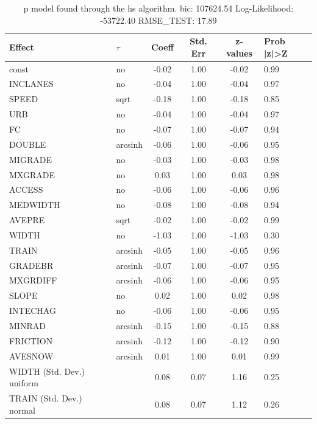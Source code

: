 \begin{table}
	\caption{p model found through the hs algorithm. bic: 107624.54 Log-Likelihood: -53722.40 RMSE_TEST: 17.89}
	\begin{center}
		\begin{tabular}{|l|l|c|c|c|l|}
			\hline
			Effect & $\tau$ & Coeff & Std. Err & z-values & Prob |z|>Z \\
			\hline
			const & no & -0.02 & 1.00 & -0.02 & 0.99 \\
			\hline
			INCLANES & no & -0.04 & 1.00 & -0.04 & 0.97 \\
			\hline
			SPEED & sqrt & -0.18 & 1.00 & -0.18 & 0.85 \\
			\hline
			URB & no & -0.04 & 1.00 & -0.04 & 0.97 \\
			\hline
			FC & no & -0.07 & 1.00 & -0.07 & 0.94 \\
			\hline
			DOUBLE & arcsinh & -0.06 & 1.00 & -0.06 & 0.95 \\
			\hline
			MIGRADE & no & -0.03 & 1.00 & -0.03 & 0.98 \\
			\hline
			MXGRADE & no & 0.03 & 1.00 & 0.03 & 0.98 \\
			\hline
			ACCESS & no & -0.06 & 1.00 & -0.06 & 0.96 \\
			\hline
			MEDWIDTH & no & -0.08 & 1.00 & -0.08 & 0.94 \\
			\hline
			AVEPRE & sqrt & -0.02 & 1.00 & -0.02 & 0.99 \\
			\hline
			WIDTH & no & -1.03 & 1.00 & -1.03 & 0.30 \\
			\hline
			TRAIN & arcsinh & -0.05 & 1.00 & -0.05 & 0.96 \\
			\hline
			GRADEBR & arcsinh & -0.07 & 1.00 & -0.07 & 0.95 \\
			\hline
			MXGRDIFF & arcsinh & -0.06 & 1.00 & -0.06 & 0.95 \\
			\hline
			SLOPE & no & 0.02 & 1.00 & 0.02 & 0.98 \\
			\hline
			INTECHAG & no & -0.06 & 1.00 & -0.06 & 0.95 \\
			\hline
			MINRAD & arcsinh & -0.15 & 1.00 & -0.15 & 0.88 \\
			\hline
			FRICTION & arcsinh & -0.12 & 1.00 & -0.12 & 0.90 \\
			\hline
			AVESNOW & arcsinh & 0.01 & 1.00 & 0.01 & 0.99 \\
			\hline
			WIDTH (Std. Dev.) uniform &  & 0.08 & 0.07 & 1.16 & 0.25 \\
			\hline
			TRAIN (Std. Dev.) normal &  & 0.08 & 0.07 & 1.12 & 0.26 \\

\end{tabular}
\end{center}
\end{table}
